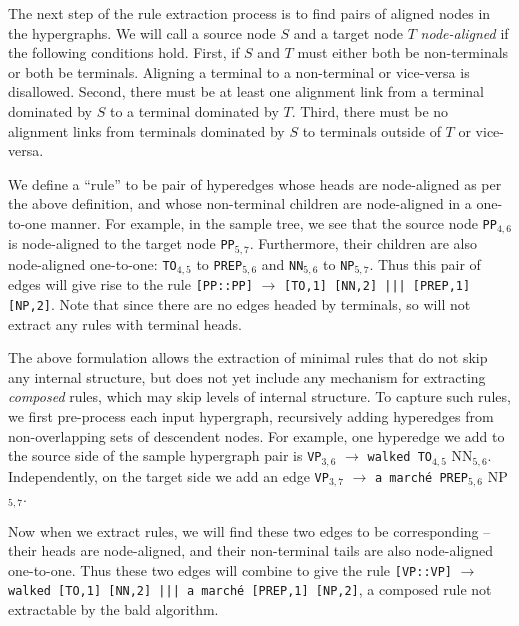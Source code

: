 \documentclass[nofonts]{pbml} %
\begin{document}
The next step of the rule extraction process is to find pairs of aligned nodes in the hypergraphs.
We will call a source node $S$ and a target node $T$ \emph{node-aligned} if the following conditions hold.
First, if $S$ and $T$ must either both be non-terminals or both be terminals.
Aligning a terminal to a non-terminal or vice-versa is disallowed.
Second, there must be at least one alignment link from a terminal dominated by $S$ to a terminal dominated by $T$.
Third, there must be no alignment links from terminals dominated by $S$ to terminals outside of $T$ or vice-versa.

We define a ``rule'' to be pair of hyperedges whose heads are node-aligned as per the above definition,
and whose non-terminal children are node-aligned in a one-to-one manner.
For example, in the sample tree, we see that the source node \texttt{PP}$_{4,6}$ is
node-aligned to the target node \texttt{PP}$_{5,7}$. Furthermore, their children are also node-aligned
one-to-one: \texttt{TO}$_{4,5}$ to \texttt{PREP}$_{5,6}$ and \texttt{NN}$_{5,6}$ to \texttt{NP}$_{5,7}$.
Thus this pair of edges will give rise to the rule \texttt{[PP::PP]} $\rightarrow$ \texttt{[TO,1] [NN,2] ||| [PREP,1] [NP,2]}.
Note that since there are no edges headed by terminals, so will not extract any rules with terminal heads.

The above formulation allows the extraction of minimal rules that do not skip any internal structure, but does not yet
include any mechanism for extracting \emph{composed} rules, which may skip levels of internal structure.
To capture such rules, we first pre-process each input hypergraph, recursively adding hyperedges from non-overlapping sets
of descendent nodes. For example, one hyperedge we add to the source side of the sample hypergraph pair is
\texttt{VP}$_{3,6}$ $\rightarrow$ \texttt{walked TO}$_{4,5}$ NN$_{5,6}$. Independently, on the target side we add an edge
\texttt{VP}$_{3,7}$ $\rightarrow$ \texttt{a march\'{e} PREP}$_{5,6}$ NP$_{5,7}$.

Now when we extract rules, we will find these two edges to be corresponding -- their heads are node-aligned, and their non-terminal
tails are also node-aligned one-to-one. Thus these two edges will combine to give the rule
\texttt{[VP::VP]} $\rightarrow$ \texttt{walked [TO,1] [NN,2] ||| a march\'{e} [PREP,1] [NP,2]}, a composed rule not extractable
by the bald algorithm.
\end{document}
